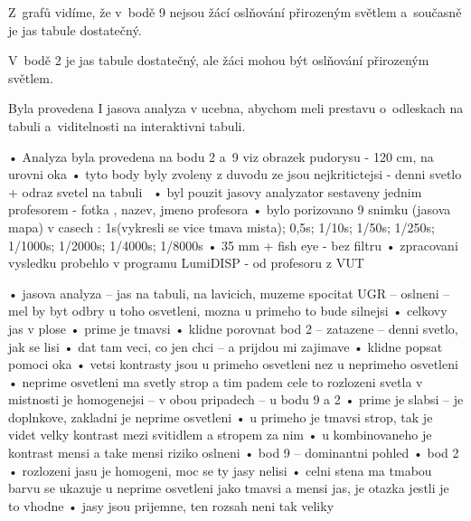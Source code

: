 Z~grafů vidíme, že v~bodě 9 nejsou žácí oslňování přirozeným světlem a~současně je jas tabule dostatečný.

V~bodě 2 je jas tabule dostatečný, ale žáci mohou být oslňování přirozeným světlem.

Byla provedena I jasova analyza v ucebna, abychom meli prestavu o~odleskach na tabuli a~viditelnosti na interaktivni tabuli.

    • Analyza byla provedena na bodu 2 a~9 viz obrazek pudorysu - 120 cm, na urovni oka
    \medskip
    • tyto body byly zvoleny z duvodu ze jsou nejkritictejsi - denni svetlo + odraz svetel na tabuli\
    \medskip
    • byl pouzit jasovy analyzator sestaveny jednim profesorem - fotka , nazev, jmeno profesora
    \medskip
    • bylo porizovano 9 snimku (jasova mapa) v casech : 1s(vykresli se vice tmava mista); 0,5s; 1/10s; 1/50s; 1/250s; 1/1000s; 1/2000s; 1/4000s; 1/8000s
    \medskip
    • 35 mm + fish eye - bez filtru
    \medskip
    • zpracovani vysledku probehlo v programu LumiDISP - od profesoru z VUT

    • jasova analyza – jas na tabuli, na lavicich, muzeme spocitat UGR – oslneni – mel by byt odbry u toho osvetleni, mozna u primeho to bude silnejsi
    \medskip
    • celkovy jas v plose
    \medskip
    • prime je tmavsi
    \medskip
    • klidne porovnat bod 2 – zatazene – denni svetlo, jak se lisi
    \medskip
    • dat tam veci, co jen chci – a prijdou mi zajimave
    \medskip
    • klidne popsat pomoci oka
    \medskip
    • vetsi kontrasty jsou u primeho osvetleni nez u neprimeho osvetleni
    \medskip
    • neprime osvetleni ma svetly strop a tim padem cele to rozlozeni svetla v mistnosti je homogenejsi – v obou pripadech – u bodu 9 a 2
    \medskip
    • prime je slabsi – je doplnkove, zakladni je neprime osvetleni
    \medskip
    • u primeho je tmavsi strop, tak je videt velky kontrast mezi svitidlem a stropem za nim
    \medskip
    • u kombinovaneho je kontrast mensi a take mensi riziko oslneni
    \medskip
    • bod 9 – dominantni pohled
    \medskip
    • bod 2 
    • rozlozeni jasu je homogeni, moc se ty jasy nelisi
    \medskip
    • celni stena ma tmabou barvu se ukazuje u neprime osvetleni jako tmavsi a mensi jas, je otazka jestli je to vhodne
    \medskip
    • jasy jsou prijemne, ten rozsah neni tak veliky


















